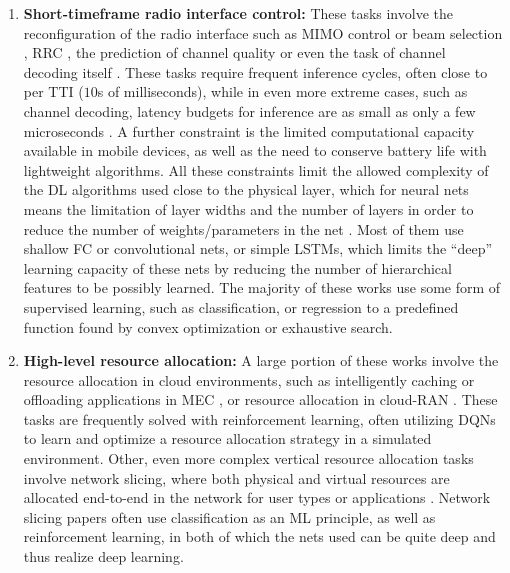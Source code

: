 			\begin{enumerate}[label=\textbf{\alph*})]
				\item 
					\textbf{Short-timeframe radio interface control:}
					These tasks involve the reconfiguration of the radio interface such as \ac{MIMO} control or beam selection \cite{dl_based_beam_select, dl_based_pilot_alloc}, \ac{RRC} \cite{dl_based_rrc, dl_for_rrc}, the prediction of channel quality \cite{channel_state_pred} or even the task of channel decoding itself \cite{channel_decoding_dl}.
					These tasks require frequent inference cycles, often close to per \ac{TTI} ($10$s of milliseconds), while in even more extreme cases, such as channel decoding, latency budgets for inference are as small as only a few microseconds \cite{dl_phys_survey}.
					A further constraint is the limited computational capacity available in mobile devices, as well as the need to conserve battery life with lightweight algorithms.
					All these constraints limit the allowed complexity of the \ac{DL} algorithms used close to the physical layer, which for neural nets means the limitation of layer widths and the number of layers in order to reduce the number of weights/parameters in the net \cite{dl_phys_survey2}.
					Most of them use shallow \ac{FC} or convolutional nets, or simple \acp{LSTM}, which limits the ``deep'' learning capacity of these nets by reducing the number of hierarchical features to be possibly learned.
					The majority of these works use some form of supervised learning, such as classification, or regression to a predefined function found by convex optimization or exhaustive search.
				
				\item
					\textbf{High-level resource allocation:}
					A large portion of these works involve the resource allocation in cloud environments, such as intelligently caching or offloading applications in \ac{MEC} \cite{mec_offload_cache, mec_offload}, or resource allocation in cloud-\ac{RAN} \cite{cloud_ran_resource}.
					These tasks are frequently solved with reinforcement learning, often utilizing \acp{DQN} to learn and optimize a resource allocation strategy in a simulated environment.
					Other, even more complex vertical resource allocation tasks involve network slicing, where both physical and virtual resources are allocated end-to-end in the network for user types or applications \cite{slicing_resource, drl_slicing_resource, slicing_resource2}.
					Network slicing papers often use classification as an \ac{ML} principle, as well as reinforcement learning, in both of which the nets used can be quite deep and thus realize deep learning.
							

\end{enumerate}
